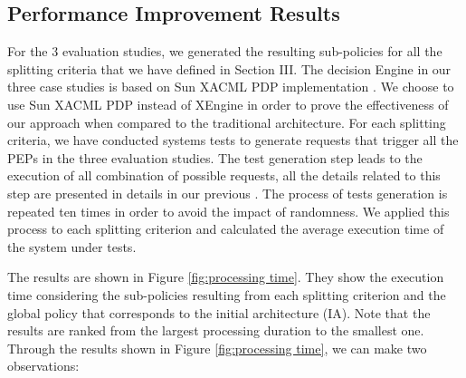 \subsection{Performance Improvement Results}
For the 3 evaluation studies, we generated the resulting sub-policies for all the splitting criteria that we have defined in Section III.
The decision Engine in our three case studies is based on Sun XACML PDP implementation \cite{sunxacml}. We choose to use Sun XACML PDP instead of XEngine in order 
to prove the effectiveness of our approach when compared to the traditional architecture.
For each splitting criteria, we have conducted systems tests to generate requests that trigger all the PEPs in the three evaluation studies. 
The test generation step leads to the execution of all combination of possible requests, all the details related to this step are presented 
in details in our previous \cite{testcase}.  
The process of tests generation is repeated ten times in order to avoid the impact of randomness.
We applied this process to each splitting criterion and calculated the average execution time of the system under tests.


The results are shown in Figure \ref{fig:processing time}. They show the execution time considering the sub-policies resulting from each splitting criterion and the global policy 
that corresponds to the initial architecture (IA). Note that the results are ranked from the largest processing duration to the smallest one. 
Through the results shown in Figure \ref{fig:processing time}, we can make two observations:


